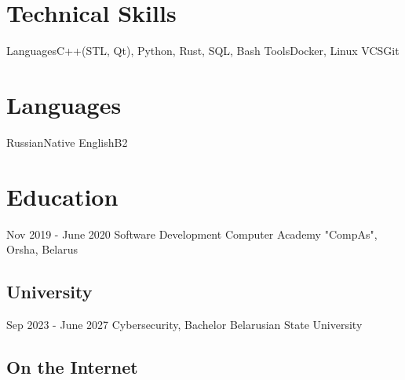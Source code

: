 \documentclass[11pt,a4paper]{moderncv}
\begin{document}
\section{Technical Skills}
\cvline
  {Languages}{C++(STL, Qt), Python, Rust, SQL, Bash}
\cvline 
  {Tools}{Docker, Linux}
\cvline
  {VCS}{Git}
\section {Languages}
\cvline 
  {Russian}{Native}
\cvline 
  {English}{B2}
\section{Education}
  \cventry
    {Nov 2019 - June 2020}
    {Software Development}
    {Computer Academy "CompAs", Orsha, Belarus}
    {}{}{}
  \subsection{University}
  \cventry
    {Sep 2023 - June 2027}
    {Cybersecurity, Bachelor}
    {Belarusian State University}
    {}{}{}


  \subsection{On the Internet}
\end{document}
